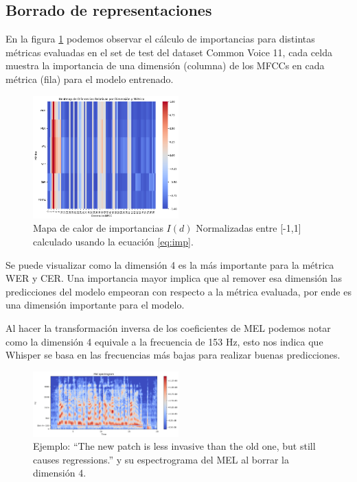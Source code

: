 \documentclass[conference]{IEEEtran}
\begin{document}
\subsection{Borrado de representaciones}

En la figura \ref{fig:cv_imp} podemos observar el cálculo de importancias para distintas métricas evaluadas en el set de test del dataset Common Voice 11, cada celda muestra la importancia de una dimensión (columna) de los MFCCs en cada métrica (fila) para el modelo entrenado.

\begin{figure}[H]
\centering
\includegraphics[width=0.5\textwidth]{images/importance_plot_all_dims.png}
\caption{Mapa de calor de importancias $I(d)$ Normalizadas entre [-1,1] calculado usando la ecuación \ref{eq:imp}.}
\label{fig:cv_imp}
\end{figure}

Se puede visualizar como la dimensión 4 es la más importante para la métrica WER y CER.
Una importancia mayor implica que al remover esa dimensión las predicciones del modelo empeoran con respecto a la métrica evaluada, por ende es una dimensión importante para el modelo.

Al hacer la transformación inversa de los coeficientes de MEL podemos notar como la dimensión 4 equivale a la frecuencia de 153 Hz, esto nos indica que Whisper se basa en las frecuencias más bajas para realizar buenas predicciones.
\begin{figure}[H]
\centering
\includegraphics[width=0.5\textwidth]{images/dim_4_erasured.png}
\caption{Ejemplo: “The new patch is less invasive than the old one, but still causes regressions.” y su espectrograma del MEL al borrar la dimensión 4.}
\label{fig:mel_erasure_dim_4}
\end{figure}
\end{document}
